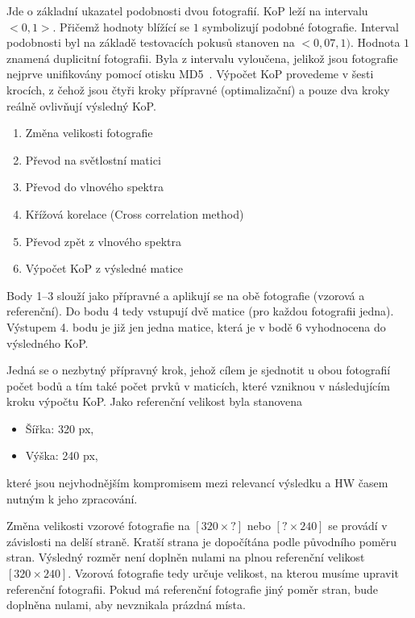 Jde o základní ukazatel podobnosti dvou fotografií. KoP leží na intervalu $ <0,1> $. Přičemž hodnoty blížící se $ 1 $ symbolizují podobné fotografie. Interval podobnosti byl na základě testovacích pokusů stanoven na $ <0,07, 1) $. Hodnota $ 1 $ znamená duplicitní fotografii. Byla z intervalu vyloučena, jelikož jsou fotografie nejprve unifikovány pomocí otisku MD5~\cite{md5}.
Výpočet KoP provedeme v šesti krocích, z čehož jsou čtyři kroky přípravné (optimalizační) a pouze dva kroky reálně ovlivňují výsledný KoP.
\begin{enumerate}
	\setlength{\parskip}{0pt}
	\setlength{\itemsep}{0pt}
	\item {Změna velikosti fotografie}
	\item {Převod na světlostní matici}
	\item {Převod do vlnového spektra}
	\item {Křížová korelace (Cross correlation method)}
	\item {Převod zpět z vlnového spektra}
	\item {Výpočet KoP z výsledné matice}
\end{enumerate}
Body 1--3 slouží jako přípravné a aplikují se na obě fotografie (vzorová a referenční). Do bodu 4 tedy vstupují dvě matice (pro každou fotografii jedna). Výstupem 4. bodu je již jen jedna matice, která je v bodě 6 vyhodnocena do výsledného KoP.

Jedná se o nezbytný přípravný krok, jehož cílem je sjednotit u obou fotografií počet bodů a tím také počet prvků v maticích, které vzniknou v následujícím kroku výpočtu KoP.
Jako referenční velikost byla stanovena
\begin{itemize}
	\setlength{\parskip}{0pt}
	\setlength{\itemsep}{0pt}
	\item Šířka: 320 px,
	\item Výška: 240 px,
\end{itemize}
které jsou nejvhodnějším kompromisem mezi relevancí výsledku a HW časem nutným k jeho zpracování.

Změna velikosti vzorové fotografie na $ [320 × ?] $ nebo $ [? × 240] $ se provádí v závislosti na delší straně. Kratší strana je dopočítána podle původního poměru stran. Výsledný rozměr není doplněn nulami na plnou referenční velikost $ [320 × 240] $. Vzorová fotografie tedy určuje velikost, na kterou musíme upravit referenční fotografii. Pokud má referenční fotografie jiný poměr stran, bude doplněna nulami, aby nevznikala prázdná místa.

